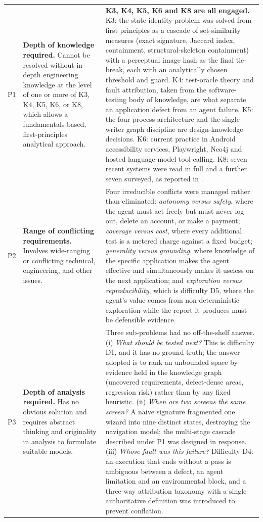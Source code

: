 \begin{xltabular}{\textwidth}{@{}l>{\hsize}Y>{\hsize}Y@{}}
  P1 & \textbf{Depth of knowledge required.} Cannot be resolved without in-depth engineering knowledge at the level of one or more of K3, K4, K5, K6, or K8, which allows a fundamentals-based, first-principles analytical approach. &
  \textbf{K3, K4, K5, K6 and K8 are all engaged.} K3: the state-identity problem was solved from first principles as a cascade of set-similarity measures (exact signature, Jaccard index, containment, structural-skeleton containment) with a perceptual image hash as the final tie-break, each with an analytically chosen threshold and guard. K4: test-oracle theory and fault attribution, taken from the software-testing body of knowledge, are what separate an application defect from an agent failure. K5: the four-process architecture and the single-writer graph discipline are design-knowledge decisions. K6: current practice in Android accessibility services, Playwright, Neo4j and hosted language-model tool-calling. K8: seven recent systems were read in full and a further seven surveyed, as reported in . \\
  \addlinespace
  P2 & \textbf{Range of conflicting requirements.} Involves wide-ranging or conflicting technical, engineering, and other issues. &
  Four irreducible conflicts were managed rather than eliminated: \emph{autonomy versus safety}, where the agent must act freely but must never log out, delete an account, or make a payment; \emph{coverage versus cost}, where every additional test is a metered charge against a fixed budget; \emph{generality versus grounding}, where knowledge of the specific application makes the agent effective and simultaneously makes it useless on the next application; and \emph{exploration versus reproducibility}, which is difficulty D5, where the agent's value comes from non-deterministic exploration while the report it produces must be defensible evidence. \\
  \addlinespace
  P3 & \textbf{Depth of analysis required.} Has no obvious solution and requires abstract thinking and originality in analysis to formulate suitable models. &
  Three sub-problems had no off-the-shelf answer. (i) \emph{What should be tested next?} This is difficulty D1, and it has no ground truth; the answer adopted is to rank an unbounded space by evidence held in the knowledge graph (uncovered requirements, defect-dense areas, regression risk) rather than by any fixed heuristic. (ii) \emph{When are two screens the same screen?} A naive signature fragmented one wizard into nine distinct states, destroying the navigation model; the multi-stage cascade described under P1 was designed in response. (iii) \emph{Whose fault was this failure?} Difficulty D4: an execution that ends without a pass is ambiguous between a defect, an agent limitation and an environmental block, and a three-way attribution taxonomy with a single authoritative definition was introduced to prevent conflation. \\

\end{xltabular}
